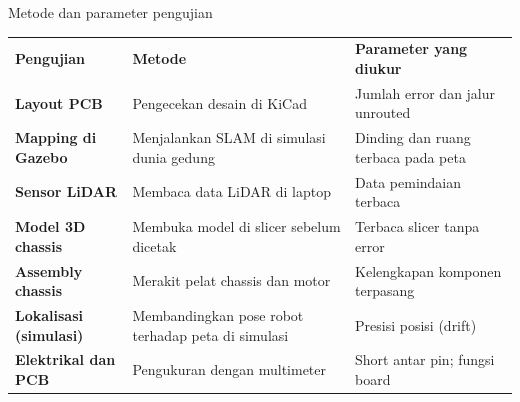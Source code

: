 \documentclass[aspectratio=169,10pt,t]{beamer}
\gdef\currnum{00}
\gdef\currlabel{}
\newcommand{\sect}[2]{\gdef\currnum{#1}\gdef\currlabel{#2}}
\newcommand{\hd}[1]{\bfseries\color{white}#1}
\newcommand{\tablestyle}{\small\setlength{\tabcolsep}{6pt}\setlength{\extrarowheight}{3pt}\arrayrulecolor{rule}}
\begin{document}
    \sect{05}{Pengujian yang telah dilakukan}
    \begin{frame}{Metode dan parameter pengujian}
        \tablestyle
        \renewcommand{\arraystretch}{1.1}
        \begin{tabularx}{\textwidth}{L{3.6cm} Y Y}
    \hd{Pengujian}&\hd{Metode}&\hd{Parameter yang diukur}\\
    \textbf{\color{rblue}Layout PCB}&Pengecekan desain di KiCad&Jumlah error dan jalur unrouted\\
    \textbf{\color{rblue}Mapping di Gazebo}&Menjalankan SLAM di simulasi dunia gedung&Dinding dan ruang terbaca pada peta\\
    \textbf{\color{rblue}Sensor LiDAR}&Membaca data LiDAR di laptop&Data pemindaian terbaca\\
    \textbf{\color{rblue}Model 3D chassis}&Membuka model di slicer sebelum dicetak&Terbaca slicer tanpa error\\
    \textbf{\color{rblue}Assembly chassis}&Merakit pelat chassis dan motor&Kelengkapan komponen terpasang\\
    \textbf{\color{rblue}Lokalisasi (simulasi)}&Membandingkan pose robot terhadap peta di simulasi&Presisi posisi (drift)\\
    \textbf{\color{rblue}Elektrikal dan PCB}&Pengukuran dengan multimeter&Short antar pin; fungsi board\\
    \hline
        \end{tabularx}
    \end{frame}
\end{document}
